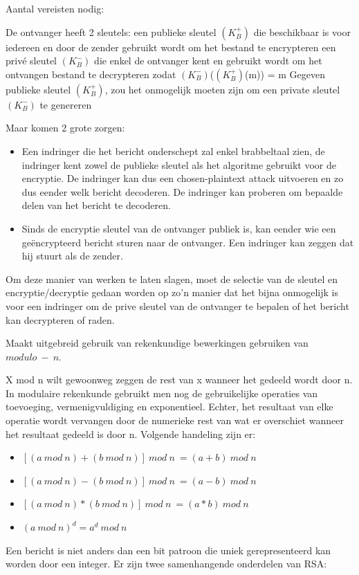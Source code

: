 \noindent Aantal vereisten nodig:

\be
\itf De ontvanger heeft 2 sleutels:
    \be
    \itf een publieke sleutel $(K^+_B)$ die beschikbaar is voor iedereen en door de zender gebruikt wordt om het bestand te encrypteren
    \itf een privé sleutel $(K^-_B)$ die enkel de ontvanger kent en gebruikt wordt om het ontvangen bestand te decrypteren
   \itf zodat $(K^-_B)$($(K^+_B)$(m)) = m
    \ee
\itf Gegeven publieke sleutel $(K^+_B)$, zou het onmogelijk moeten zijn om een private sleutel $(K^-_B)$ te genereren
\ee

\noindent Maar komen 2 grote zorgen:
\begin{itemize}
\item Een indringer die het bericht onderschept zal enkel brabbeltaal zien, de indringer kent zowel de publieke sleutel als het algoritme gebruikt voor de encryptie. De indringer kan dus een chosen-plaintext attack uitvoeren en zo dus eender welk bericht decoderen. De indringer kan proberen om bepaalde delen van het bericht te decoderen.
\item Sinds de encryptie sleutel van de ontvanger publiek is, kan eender wie een geëncrypteerd bericht sturen naar de ontvanger. Een indringer kan zeggen dat hij stuurt als de zender.

\end{itemize}

\noindent Om deze manier van werken te laten slagen, moet de selectie van de sleutel en encryptie/decryptie gedaan worden op zo’n manier dat het bijna onmogelijk is voor een indringer om de prive sleutel van de ontvanger te bepalen of het bericht kan decrypteren of raden.


Maakt uitgebreid gebruik van rekenkundige bewerkingen gebruiken van $modulo \ - \ n$.

\noindent X mod n wilt gewoonweg zeggen de rest van x wanneer het gedeeld wordt door n. In modulaire rekenkunde gebruikt men nog de gebruikelijke operaties van toevoeging, vermenigvuldiging en exponentieel. Echter, het resultaat van elke operatie wordt vervangen door de numerieke rest van wat er overschiet wanneer het resultaat gedeeld is door n.
Volgende handeling zijn er:

\begin{itemize}

\item $[(a\ mod\ n)  + (b\ mod\ n)] \ mod\ n\ = (a + b)\ mod\ n$
\item $[(a\ mod\ n) - (b\ mod\ n)] \ mod\ n\ = (a - b)\ mod\ n$
\item $[(a\ mod\ n) * (b\ mod\ n)] \ mod\ n\ = (a * b)\ mod\ n$
\item $(a\ mod\ n)^d = a^d\ mod\ n$
\end{itemize}
Een bericht is niet anders dan een bit patroon die uniek gerepresenteerd kan worden door een integer. Er zijn twee samenhangende onderdelen van RSA:

